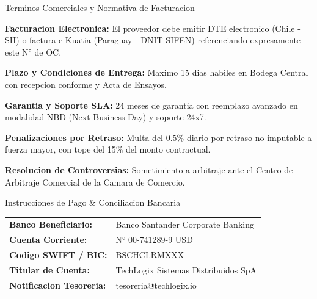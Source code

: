 \documentclass[11pt,a4paper]{article}
\begin{document}
\noindent
\begin{minipage}[t]{0.53\textwidth}
  \begin{corpnote}{Terminos Comerciales y Normativa de Facturacion}
    \begin{itemize}[leftmargin=*, noitemsep, topsep=1pt]
      {\scriptsize
      \item \textbf{Facturacion Electronica:} El proveedor debe emitir DTE electronico (Chile - SII) o factura e-Kuatia (Paraguay - DNIT SIFEN) referenciando expresamente este N° de OC.
      \item \textbf{Plazo y Condiciones de Entrega:} Maximo 15 dias habiles en Bodega Central con recepcion conforme y Acta de Ensayos.
      \item \textbf{Garantia y Soporte SLA:} 24 meses de garantia con reemplazo avanzado en modalidad NBD (Next Business Day) y soporte 24x7.
      \item \textbf{Penalizaciones por Retraso:} Multa del 0.5\% diario por retraso no imputable a fuerza mayor, con tope del 15\% del monto contractual.
      \item \textbf{Resolucion de Controversias:} Sometimiento a arbitraje ante el Centro de Arbitraje Comercial de la Camara de Comercio.}
    \end{itemize}
  \end{corpnote}

  \vspace{2mm}

  \begin{corpcard}{Instrucciones de Pago \& Conciliacion Bancaria}
    {\scriptsize\renewcommand{\arraystretch}{1.2}
    \begin{tabular}{@{}ll@{}}
      \textbf{Banco Beneficiario:} & Banco Santander Corporate Banking \\
      \textbf{Cuenta Corriente:} & N° 00-741289-9 USD \\
      \textbf{Codigo SWIFT / BIC:} & BSCHCLRMXXX \\
      \textbf{Titular de Cuenta:} & TechLogix Sistemas Distribuidos SpA \\
      \textbf{Notificacion Tesoreria:} & tesoreria@techlogix.io
    \end{tabular}}
  \end{corpcard}
\end{minipage}\hfill
\end{document}
